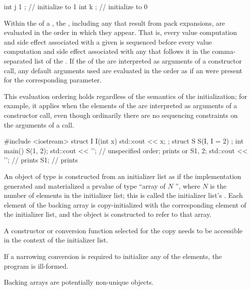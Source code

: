 \begin{itemize}
\begin{example}
\begin{codeblock}
int j { 1 };                        // initialize to 1
int k { };                          // initialize to 0
\end{codeblock}
\end{example}

\end{itemize}

\pnum
Within the  of a ,
the , including any that result from pack
expansions, are evaluated in the order in which they
appear. That is, every value computation and side effect associated with a
given  is sequenced before every value
computation and side effect associated with any 
that follows it in the comma-separated list of the .
If the  of
the 
are interpreted as arguments of a constructor call,
any default arguments used are evaluated in the order as if
an  were present for the corresponding parameter.
\begin{note}
This evaluation ordering holds regardless of the semantics of the
initialization; for example, it applies when the elements of the
 are interpreted as arguments of a constructor
call, even though ordinarily there are no sequencing constraints on the
arguments of a call.
\end{note}
\begin{example}
\begin{codeblock}
#include <iostream>
struct I {
  I(int x) { std::cout << x; }
};
struct S {
  S(I, I = 2) {}
};
int main() {
  S(1, 2); std::cout << '\n';   // unspecified order; prints  or 
  S{1, 2}; std::cout << '\n';   // prints 
  S{1};                         // prints 
}
\end{codeblock}
\end{example}

\pnum
An object of type  is constructed from
an initializer list as if
the implementation generated and materialized
a prvalue of type ``array of $N$ '',
where $N$ is the number of elements in the initializer list;
this is called the initializer list's .
Each element of the backing array is copy-initialized with the
corresponding element of the initializer list, and the
 object is constructed to refer to that array.
\begin{note}
A constructor or conversion function selected for the copy needs to be
accessible in the context of the initializer list.
\end{note}
If a narrowing conversion is required to initialize any of the elements,
the program is ill-formed.
\begin{note}
Backing arrays are potentially non-unique objects.
\end{note}

